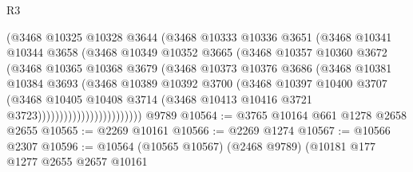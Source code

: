 \begin{lexlean}{R3}
\begin{coremodule}
                            (@3468
                              @10325
                              @10328
                              @3644
                              (@3468
                                @10333
                                @10336
                                @3651
                                (@3468
                                  @10341
                                  @10344
                                  @3658
                                  (@3468
                                    @10349
                                    @10352
                                    @3665
                                    (@3468
                                      @10357
                                      @10360
                                      @3672
                                      (@3468
                                        @10365
                                        @10368
                                        @3679
                                        (@3468
                                          @10373
                                          @10376
                                          @3686
                                          (@3468
                                            @10381
                                            @10384
                                            @3693
                                            (@3468
                                              @10389
                                              @10392
                                              @3700
                                              (@3468
                                                @10397
                                                @10400
                                                @3707
                                                (@3468
                                                  @10405
                                                  @10408
                                                  @3714
                                                  (@3468
                                                    @10413
                                                    @10416
                                                    @3721
                                                    @3723))))))))))))))))))))))))
    @9789
@10564 := @3765 @10164 @661 @1278 @2658 @2655
@10565 := @2269 @10161
@10566 := @2269 @1274
@10567 := @10566 @2307
@10596 := @10564
    (@10565 @10567)
    (@2468 @9789)
    (@10181
      @177
      @1277
      @2655
      @2657
      @10161

\end{coremodule}
\end{lexlean}
